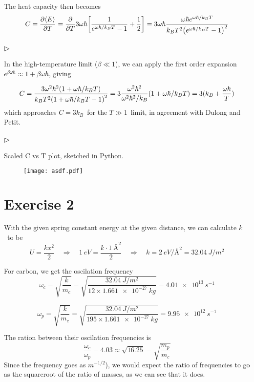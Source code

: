 \documentclass[12p,a4paper]{article}
\renewcommand{\exp}{e^}
\renewcommand{\exp}{e^}
\begin{document}
The heat capacity then becomes
\[
C = \pdv{\langle E \rangle}{T} = \pdv{T}3\omega\hbar\qty[\frac{1}{\exp{\omega\hbar/k_BT} - 1} + \frac{1}{2}] = 3\omega\hbar\frac{\omega\hbar\exp{\omega\hbar/k_BT}}{k_BT^2\qty(\exp{\omega\hbar/k_BT} - 1)^2}
\]


\subsubsection*{$\rhd$}
In the high-temperature limit ($\beta \ll 1$), we can apply the first order expansion $\exp{\beta\omega\hbar} \approx 1 + \beta\omega\hbar$, giving

\[
    C = \frac{3\omega^2\hbar^2(1 + \omega\hbar/k_BT)}{k_BT^2\qty(1 + \omega\hbar/k_BT - 1)^2}
    = 3\frac{\omega^2\hbar^2}{\omega^2\hbar^2/k_B}(1 + \omega\hbar/k_BT) = 3(k_B + \frac{\omega\hbar}{T})
\]
which approaches $C = 3k_B$ for the $T \gg 1$ limit, in agreement with Dulong and Petit.


\subsubsection*{$\rhd$}
Scaled C vs T plot, sketched in Python.
\begin{figure}[H]
    \centering
    \texttt{[image: asdf.pdf]}
\end{figure}




\section*{Exercise 2}
With the given spring constant energy at the given distance, we can calculate $k$ to be
\[
    U = \frac{kx^2}{2} \quad\Rightarrow\quad
    \SI{1}{eV} = \frac{k \cdot \SI{1}{Å}^2}{2} \quad\Rightarrow\quad k = \SI{2}{eV/Å^2} = \SI{32.04}{J/m^2}
\]

For carbon, we get the oscilation frequency
\[
    \omega_c = \sqrt{\frac{k}{m_c}} = \sqrt{\frac{\SI{32.04}{J/m^2}}{12\times \SI{1.661e-27}{kg}}} = \SI{4.01e13}{s^{-1}}
\]

\[
    \omega_p = \sqrt{\frac{k}{m_c}} = \sqrt{\frac{\SI{32.04}{J/m^2}}{195\times \SI{1.661e-27}{kg}}} = \SI{9.95e12}{s^{-1}}
\]

The ration between their oscilation frequencies is
\[
    \frac{\omega_c}{\omega_p} = 4.03 \approx \sqrt{16.25} = \sqrt{\frac{m_p}{m_c}}
\]
Since the frequency goes as $m^{-1/2}$), we would expect the ratio of frequencies to go as the squareroot of the ratio of masses, as we can see that it does.
\end{document}
